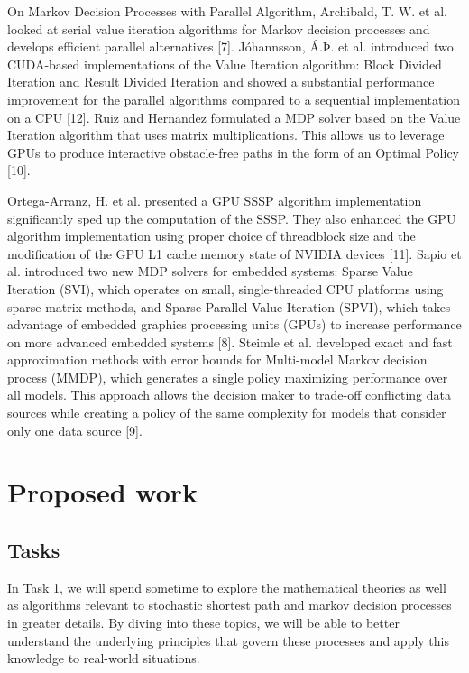 \documentclass{article}
\begin{document}
On Markov Decision Processes with Parallel Algorithm, Archibald, T. W. et al. looked at serial value iteration algorithms for Markov decision processes and develops efficient parallel alternatives [7]. 
Jóhannsson, Á.Þ. et al. introduced two CUDA-based implementations of the Value Iteration algorithm: Block Divided Iteration and Result Divided Iteration 
and showed a substantial performance improvement for the parallel algorithms compared to a sequential implementation 
on a CPU [12]. Ruiz and Hernandez formulated a MDP solver based on the Value Iteration algorithm that uses matrix 
multiplications. This allows us to leverage GPUs to produce interactive obstacle-free paths in the form of an Optimal Policy [10]. 

Ortega-Arranz, H. et al. presented a GPU SSSP algorithm implementation  significantly sped up the computation of the SSSP. They also enhanced the GPU 
algorithm implementation using proper choice of threadblock size and the modification of the GPU L1 cache memory state of 
NVIDIA devices [11]. Sapio et al. introduced two new MDP solvers for embedded 
systems: Sparse Value Iteration (SVI), which operates on small, single-threaded CPU platforms using sparse matrix methods, 
and Sparse Parallel Value Iteration (SPVI), which takes advantage of embedded graphics processing units (GPUs) to increase 
performance on more advanced embedded systems [8]. Steimle et al. developed exact and fast approximation methods with error bounds 
for Multi-model Markov decision process (MMDP), which generates a single policy maximizing performance over all models. 
This approach allows the decision maker to trade-off conflicting data sources while creating a policy of the same complexity 
for models that consider only one data source [9].

\section{Proposed work}

\subsection{Tasks}

In Task 1, we will spend sometime to explore the mathematical theories as well as algorithms 
relevant to stochastic shortest path and markov decision processes in greater details. 
By diving into these topics, we will be able to better understand the underlying principles 
that govern these processes and apply this knowledge to real-world situations. 
\end{document}
